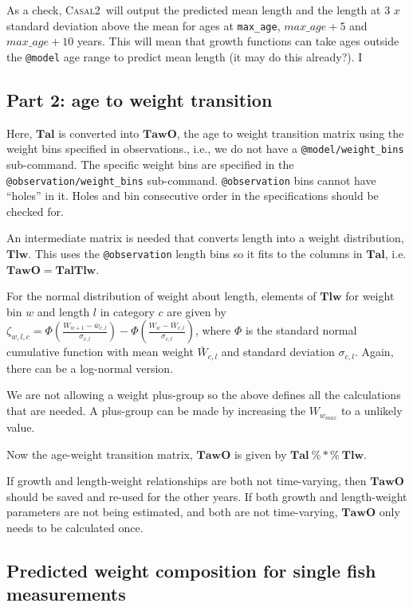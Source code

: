 \documentclass[a4paper,11pt,twoside,pdftex,draft]{article}
\newcommand{\CNAME}{\textsc{Casal2}}
\begin{document}
As a check, \CNAME~will output the predicted mean length and the length at 3 $x$ standard deviation above the mean for ages at  \texttt{max\_age}, $max\_age + 5$ and $max\_age + 10$ years. This will mean that growth functions can take ages outside the \texttt{@model} age range to predict mean length (it may do this already?). I


\subsection{Part 2: age to weight transition}
Here, $\mathbf{Tal}$ is converted into $\mathbf{TawO}$, the age to weight transition matrix  using the weight bins specified in observations., i.e., we do not have a
\texttt{@model/weight\_bins} sub-command. The specific weight bins are specified in the \texttt{@observation/weight\_bins} sub-command. 
 \texttt{@observation} bins cannot have ``holes'' in it. 
Holes and bin consecutive order in the specifications should be checked for.


An intermediate matrix is needed that converts length into a weight distribution, $\mathbf{Tlw}$. This uses the \texttt{@observation} length bins so it fits to the columns in $\mathbf{Tal}$, i.e. $\mathbf{TawO} =\mathbf{Tal} \mathbf{Tlw} $.

For the normal distribution of weight about length, 
elements of $\mathbf{Tlw}$ for weight bin $w$ and length $l$ in category $c$ are given by $\zeta_{w,l,c} = \Phi\left( \frac{W_{w+1} - \bar w_{c,l}   }{\sigma_{c,l}} \right)   - \Phi\left( \frac{W_{w} - \bar W_{c,l}   }{\sigma_{c,l}} \right)  $,
where $\Phi$ is the standard normal cumulative function with mean weight $\bar W_{c,l}$ and standard deviation $\sigma_{c,l}$. Again, there can be a log-normal version.

We are not allowing a weight plus-group so the above defines all the calculations that are needed. A  plus-group can be made by increasing the $W_{w_{max}}$ to a unlikely value.

Now the age-weight transition matrix, $\mathbf{TawO}$ is given by $\mathbf{Tal} \ \%*\%\ \mathbf{Tlw} $.

If growth and length-weight relationships are both not time-varying, then $\mathbf{TawO}$ should be saved and re-used for the other years. If both growth and length-weight parameters are not being estimated, and both are not time-varying, $\mathbf{TawO}$ only needs to be calculated once.

\subsection{Predicted weight composition for single fish measurements}
\end{document}
